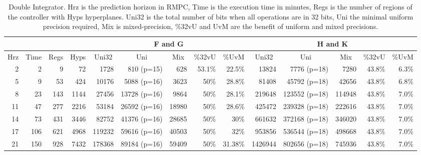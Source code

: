 \begin{table*}[t]
  \centering
  \caption{Double Integrator.\textmd{ Hrz is the prediction horizon in RMPC, Time is the execution time in minutes, Regs is the number of regions of the controller with Hyps hyperplanes. Uni32 is the total number of bits when all operations are in 32 bits, Uni the minimal uniform precision required, Mix is mixed-precision, \%32vU and UvM are the benefit of uniform and mixed precisions.}}
  \label{tab:di}
  \begin{tabular}{|rrrrrrrrrrrrrr|}
    \cline{5-14}
    \multicolumn{4}{c}{} &
    \multicolumn{5}{|c|}{F and G} &
    \multicolumn{5}{c|}{H and K} \\
    \hline
    \multicolumn{1}{|c}{Hrz}&
    \multicolumn{1}{c}{Time}&
    \multicolumn{1}{c}{Regs} &
    \multicolumn{1}{c}{Hyps} &
    \multicolumn{1}{c}{Uni32}&
    \multicolumn{1}{c}{Uni}&
    \multicolumn{1}{c}{Mix}&
    \multicolumn{1}{c}{\%32vU}&
    \multicolumn{1}{c}{\%UvM}&
    \multicolumn{1}{c}{Uni32}&
    \multicolumn{1}{c}{Uni}&
    \multicolumn{1}{c}{Mix}&
    \multicolumn{1}{c}{\%32vU}&
    \multicolumn{1}{c|}{\%UvM} \\
    \hline
    2 & 2 & 9 & 72 & 1728 & 810 (p=15) & 628 & 53.1\% & 22.5\% & 13824 & 7776 (p=18) & 7280 & 43.8\%& 6.3\% \\
    5 & 9 & 53 & 424 & 10176 & 5088 (p=16) & 3623 & 50\% & 28.8\% & 81408 & 45792 (p=18) & 42656 & 43.8\% & 6.8\% \\
    8 & 23 & 143 & 1144 & 27456 & 13728 (p=16) & 9864 & 50\%  & 28.1\% & 219648 & 123552 (p=18) & 114948 & 43.8\% & 7.0\% \\
    11 & 47 & 277 & 2216 & 53184 & 26592 (p=16) & 18980 & 50\% & 28.6\% & 425472 & 239328 (p=18) & 222616 & 43.8\% & 7.0\% \\
    
    14 & 73 & 431& 3446& 82752& 41376 (p=16)& 28685& 50\% & 30\% & 661632& 372168 (p=18)& 346020& 43.8\% &7.0\% \\
    
    17 & 106 & 621 & 4968 & 119232 & 59616 (p=16) & 40503 & 50\% & 32\% & 953856& 536544 (p=18)& 498668& 43.8\% & 7.0\% \\
    
    21 & 150 & 928 & 7432 & 178368 & 89184 (p=16) & 59409 & 50\% & 31.38\% & 1426944 & 802656 (p=18) & 745936 & 43.8\% & 7.0\%  \\
    

\end{tabular}
\end{table*}
